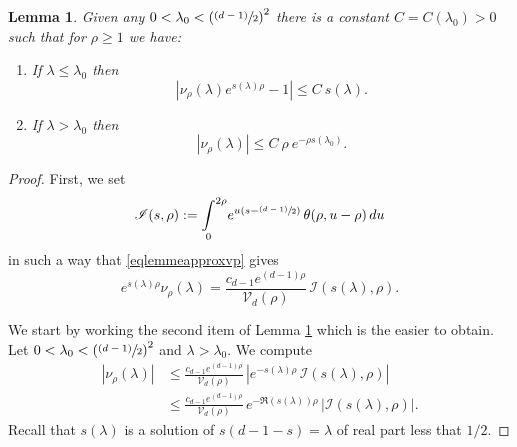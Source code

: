 \documentclass[JEP,XML,SOM,Unicode,NoFloatCountersInSection,published]{cedram}
\let\mathcal\mathscr
\newcommand{\psfrac}[2]{\sfrac{(#1)}{#2}}
\theoremstyle{plain}
\newtheorem{lemma}[equation]{Lemma}
\theoremstyle{definition}
\newcommand{\inte}[1]{\underset{#1}{\int}}
\begin{document}
\begin{lemma}
\label{lemmeapproxvp}
Given any $ 0 < \lambda_0 < \left(\psfrac{d-1}{2} \right)^2 $ there is a constant $C = C(\lambda_0) > 0$ such that for $\rho \ge 1$ we have:
\begin{enumerate}
\item If $\lambda \le \lambda_0$ then
\[
| \nu_{\rho}(\lambda) e^{s(\lambda) \rho} - 1 | \le C \ s(\lambda).
\]
\item If $\lambda > \lambda_0$ then
\[
|\nu_{\rho}(\lambda)| \le C \ \rho \ e^{- \rho s(\lambda_0)}.
\]
\end{enumerate}
\end{lemma}

\begin{proof}
First, we set
\[
\mathcal{I}(s,\rho) := \inte{0}^{2\rho} e^{u \left(s - \psfrac{d-1}{2} \right)}\, \theta(\rho, u-\rho) \,du
\]
in such a way that \eqref{eqlemmeapproxvp} gives
\[
e^{s(\lambda) \rho} \nu_{\rho}(\lambda) = \frac{ c_{d-1} e^{(d-1)\rho}} {\mathcal{V}_d(\rho)} \, \mathcal{I}(s(\lambda),\rho).
\]

We start by working the second item of Lemma \ref{lemmeapproxvp} which is the easier to obtain. Let $ 0 < \lambda_0 < \left(\psfrac{d-1}{2} \right)^2 $ and $\lambda > \lambda_0$. We compute
\begin{align*}
|\nu_{\rho}(\lambda)| & \le \frac{c_{d-1} e^{(d-1)\rho}}{\mathcal{V}_d(\rho)}\, | e^{ - s(\lambda) \rho } \, \mathcal{I}(s(\lambda),\rho) | \\
& \le \frac{c_{d-1} e^{(d-1)\rho}}{\mathcal{V}_d(\rho)}\, e^{ - \Re(s(\lambda)) \rho } \, | \mathcal{I}(s(\lambda),\rho) |.
\end{align*}
Recall that $s(\lambda)$ is a solution of $s(d-1 -s) = \lambda$ of real part less that $1/2$.


\end{proof}
\end{document}
